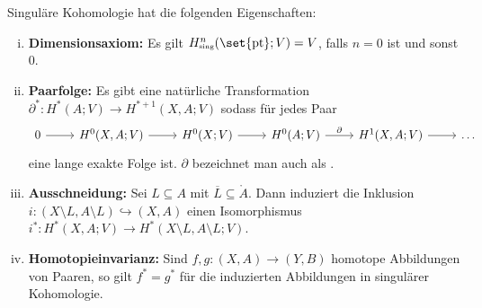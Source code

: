 \begin{satz}[{name=[Eigenschaften singulärer Kohomologie]},label=satz:110]
	Singuläre Kohomologie hat die folgenden Eigenschaften:
	\begin{enumerate}[i),itemsep=1.5pt]
		\item \textbf{Dimensionsaxiom:} Es gilt $H^n_\sing(\set{\pt};V) = V$, falls $n=0$ ist und sonst $0$. 
		\item \textbf{Paarfolge:} Es gibt eine natürliche Transformation $\partial^*\colon H^*(A;V) \to H^{*+1}(X,A;V)$ sodass für jedes Paar 
		\[
			\begin{tikzcd}
				0 \rar & H^0(X,A;V) \rar & H^0(X;V) \rar & H^0(A;V) \rar["\partial"] & H^1(X,A;V) \rar & \ldots 
			\end{tikzcd}
		\]
		eine lange exakte Folge ist. $\partial$ bezeichnet man auch als .
		\item \textbf{Ausschneidung:} Sei $L \subseteq A$ mit $\overline{L} \subseteq \mathring{A}$.
		Dann induziert die Inklusion $i \colon (X \setminus L, A \setminus L) \hookrightarrow (X,A)$ einen Isomorphismus $i^* \colon H^*(X,A;V) \to H^*(X \setminus L, A \setminus L;V)$.
		\item \textbf{Homotopieinvarianz:} Sind $f,g \colon (X,A) \to (Y,B)$ homotope Abbildungen von Paaren, so gilt $f^* = g^*$ für die induzierten Abbildungen in singulärer 
		Kohomologie.
	\end{enumerate}
\end{satz}

